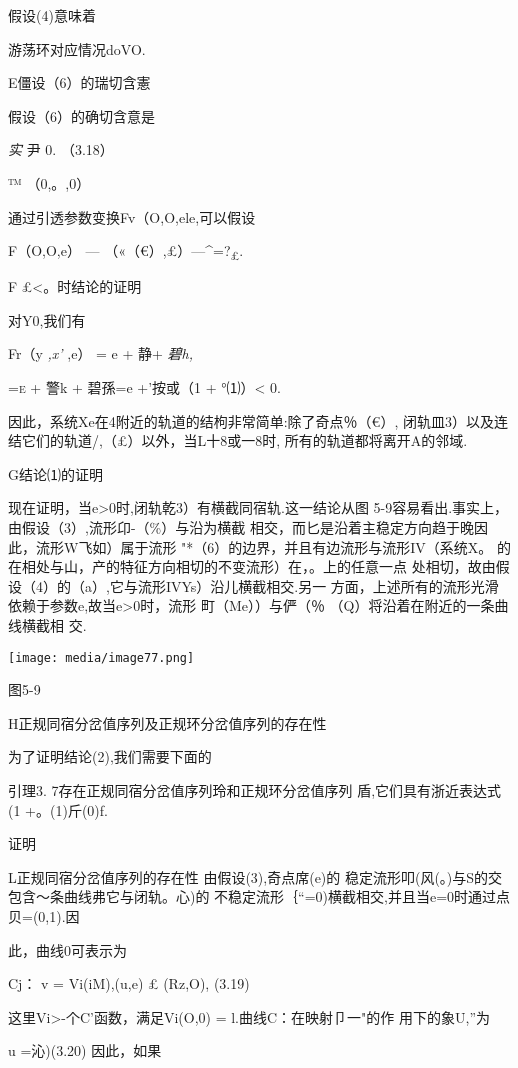 \documentclass{article}
\begin{document}
假设(4)意味着

游荡环对应情况doVO.

E僵设（6）的瑞切含憲

假设（6）的确切含意是

\emph{实} 尹 0. （3.18）

™ （0,。,0）

通过引透参数变换Fv（O,O,ele,可以假设

F（O,O,e） --- （«（€）,£）---\^{}=?\textsubscript{£}.

F £\textless{}。时结论的证明

对Y0,我们有

Fr（y \emph{,x'} ,e） = e + 静+ \emph{碧h,}

\textsc{=e} + 警k + 碧孫=e +'按或（1 + °⑴）\textless{} 0.

因此，系统Xe在4附近的轨道的结枸非常简单:除了奇点％（€）,
闭轨皿3）以及连结它们的轨道/,（£）以外，当L十8或一8时,
所有的轨道都将离开A的邻域.

G结论⑴的证明

现在证明，当e\textgreater{}0时,闭轨乾3）有横截同宿轨.这一结论从图
5-9容易看出.事实上，由假设（3）,流形卬-（\%）与沿为横截
相交，而匕是沿着主稳定方向趋于晚因此，流形W飞如）属于流形
"*（6）的边界，并且有边流形与流形IV（系统X。
的在相处与山，产的特征方向相切的不变流形）在，。上的任意一点
处相切，故由假设（4）的（a）,它与流形IVYs）沿儿横截相交.另一
方面，上述所有的流形光滑依赖于参数e,故当e\textgreater{}0时，流形
町（Me））与俨（％ （Q）将沿着在附近的一条曲线横截相 交.

\texttt{[image: media/image77.png]}

图5-9

H正规同宿分岔值序列及正规环分岔值序列的存在性

为了证明结论(2),我们需要下面的

引理3. 7存在正规同宿分岔值序列玲和正规环分岔值序列
盾,它们具有浙近表达式(1 +。(1)斤(0)f.

证明

L正规同宿分岔值序列的存在性 由假设(3),奇点席(e)的
稳定流形叩(风(。)与S的交包含〜条曲线弗它与闭轨。心)的
不稳定流形｛``=0)横截相交,并且当e=0时通过点贝=(0,1).因

此，曲线0可表示为

Cj： v = Vi(iM),(u,e) £ (Rz,O), (3.19)

这里Vi\textgreater{}-个C'函数，满足Vi(O,0) = l.曲线C：在映射卩一"的作
用下的象U,''为

u =沁)(3.20) 因此，如果
\end{document}
